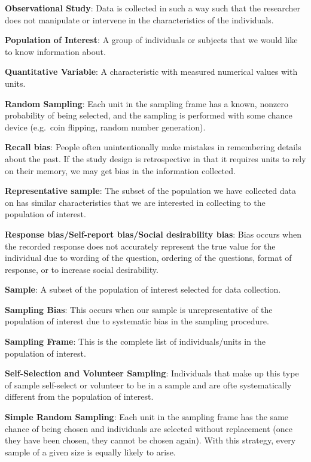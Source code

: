 \documentclass[]{book}
\begin{document}
\textbf{Observational Study}: Data is collected in such a way such that the researcher does not manipulate or intervene in the characteristics of the individuals.

\textbf{Population of Interest}: A group of individuals or subjects that we would like to know information about.

\textbf{Quantitative Variable}: A characteristic with measured numerical values with units.

\textbf{Random Sampling}: Each unit in the sampling frame has a known, nonzero probability of being selected, and the sampling is performed with some chance device (e.g.~coin flipping, random number generation).

\textbf{Recall bias}: People often unintentionally make mistakes in remembering details about the past. If the study design is retrospective in that it requires units to rely on their memory, we may get bias in the information collected.

\textbf{Representative sample}: The subset of the population we have collected data on has similar characteristics that we are interested in collecting to the population of interest.

\textbf{Response bias/Self-report bias/Social desirability bias}: Bias occurs when the recorded response does not accurately represent the true value for the individual due to wording of the question, ordering of the questions, format of response, or to increase social desirability.

\textbf{Sample}: A subset of the population of interest selected for data collection.

\textbf{Sampling Bias}: This occurs when our sample is unrepresentative of the population of interest due to systematic bias in the sampling procedure.

\textbf{Sampling Frame}: This is the complete list of individuals/units in the population of interest.

\textbf{Self-Selection and Volunteer Sampling}: Individuals that make up this type of sample self-select or volunteer to be in a sample and are ofte systematically different from the population of interest.

\textbf{Simple Random Sampling}: Each unit in the sampling frame has the same chance of being chosen and individuals are selected without replacement (once they have been chosen, they cannot be chosen again). With this strategy, every sample of a given size is equally likely to arise.
\end{document}
